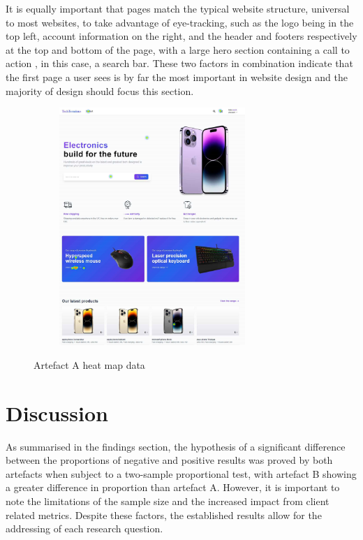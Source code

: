 \documentclass[article]{IEEEtran}
\begin{document}
        It is equally important that pages match the typical website structure, universal to most websites, to take advantage of eye-tracking, such as the logo being in the top left, account information on the right, and the header and footers respectively at the top and bottom of the page, with a large hero section containing a call to action \cite{nevarez}, in this case, a search bar. These two factors in combination indicate that the first page a user sees is by far the most important in website design and the majority of design should focus this section.

        \begin{figure}[H]
            \centering
            \caption{Artefact A heat map data}
            \includegraphics[width=9cm,height=9cm,keepaspectratio]{images/data/heatmap.png}
            \label{fig:heatmap}
        \end{figure}

    \section{Discussion}
        As summarised in the findings section, the hypothesis of a significant difference between the proportions of negative and positive results was proved by both artefacts when subject to a two-sample proportional test, with artefact B showing a greater difference in proportion than artefact A. However, it is important to note the limitations of the sample size and the increased impact from client related metrics. Despite these factors, the established results allow for the addressing of each research question. 
        
\end{document}

